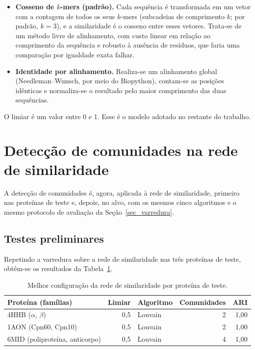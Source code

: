 \documentclass[12pt]{article}
\begin{document}
	\begin{itemize}
		\item \textbf{Cosseno de $k$-mers (padrão).} Cada sequência é transformada em um vetor com a contagem de todos os seus $k$-mers (subcadeias de comprimento $k$; por padrão, $k = 3$), e a similaridade é o cosseno entre esses vetores. Trata-se de um método livre de alinhamento, com custo linear em relação ao comprimento da sequência e robusto à ausência de resíduos, que faria uma comparação por igualdade exata falhar.
		\item \textbf{Identidade por alinhamento.} Realiza-se um alinhamento global (Needleman--Wunsch, por meio do Biopython), contam-se as posições idênticas e normaliza-se o resultado pelo maior comprimento das duas sequências.
	\end{itemize}

	O limiar é um valor entre 0 e 1. Esse é o modelo adotado no restante do trabalho.

	\section{Detecção de comunidades na rede de similaridade}
	\label{sec_deteccao}

	A detecção de comunidades é, agora, aplicada à rede de similaridade, primeiro nas proteínas de teste e, depois, no alvo, com os mesmos cinco algoritmos e o mesmo protocolo de avaliação da Seção~\ref{sec_varredura}.

	\subsection{Testes preliminares}
	\label{sec_testes_sim}

	Repetindo a varredura sobre a rede de similaridade nas três proteínas de teste, obtêm-se os resultados da Tabela~\ref{tab_similaridade}.

	\begin{table}[H]
		\centering
		\caption{Melhor configuração da rede de similaridade por proteína de teste.}
		\begin{tabular}{lrlrr}
			\toprule
			\textbf{Proteína (famílias)} & \textbf{Limiar} & \textbf{Algoritmo} & \textbf{Comunidades} & \textbf{ARI} \\
			\midrule
			4HHB ($\alpha$, $\beta$) & 0,5 & Louvain & 2 & 1,00 \\
			1AON (Cpn60, Cpn10) & 0,5 & Louvain & 2 & 1,00 \\
			6MID (poliproteína, anticorpo) & 0,5 & Louvain & 4 & 1,00 \\
			\bottomrule
		\end{tabular}
		\label{tab_similaridade}
	\end{table}
\end{document}
